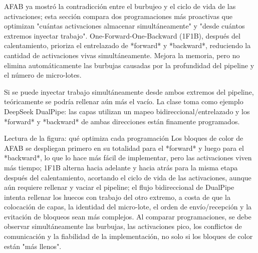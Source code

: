 AFAB ya mostró la contradicción entre el burbujeo y el ciclo de vida de las activaciones; esta sección compara dos programaciones más proactivas que optimizan "cuántas activaciones almacenar simultáneamente" y "desde cuántos extremos inyectar trabajo". One-Forward-One-Backward (1F1B), después del calentamiento, prioriza el entrelazado de *forward* y *backward*, reduciendo la cantidad de activaciones vivas simultáneamente. Mejora la memoria, pero no elimina automáticamente las burbujas causadas por la profundidad del pipeline y el número de micro-lotes.


Si se puede inyectar trabajo simultáneamente desde ambos extremos del pipeline, teóricamente se podría rellenar aún más el vacío. La clase toma como ejemplo DeepSeek DualPipe: las capas utilizan un mapeo bidireccional/entrelazado y los *forward* y *backward* de ambas direcciones están finamente programados.



\begin{knowledgebox}{Lectura de la figura: qué optimiza cada programación}
Los bloques de color de AFAB se despliegan primero en su totalidad para el *forward* y luego para el *backward*, lo que lo hace más fácil de implementar, pero las activaciones viven más tiempo; 1F1B alterna hacia adelante y hacia atrás para la misma etapa después del calentamiento, acortando el ciclo de vida de las activaciones, aunque aún requiere rellenar y vaciar el pipeline; el flujo bidireccional de DualPipe intenta rellenar los huecos con trabajo del otro extremo, a costa de que la colocación de capas, la identidad del micro-lote, el orden de envío/recepción y la evitación de bloqueos sean más complejos. Al comparar programaciones, se debe observar simultáneamente las burbujas, las activaciones pico, los conflictos de comunicación y la fiabilidad de la implementación, no solo si los bloques de color están "más llenos".
\end{knowledgebox}


